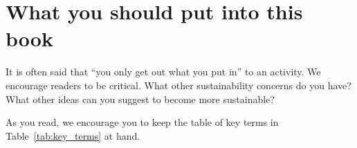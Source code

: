 {  
    \section*{What you should put into this book} 
    
    It is often said that ``you only get out what you put in'' to an activity.
  We encourage readers to be critical.
  What other sustainability concerns do you have?
    What other ideas can you suggest to become more sustainable?
    
    As you read, we encourage you to keep the table of key terms in Table~\ref{tab:key_terms} at hand.
  
  
  {
    
    \renewcommand{\thetable}{\arabic{table}}
    
}}
